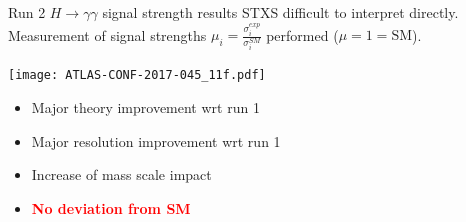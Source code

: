 \begin{frame}{Run 2 $H\rightarrow \gamma\gamma$ signal strength results}
  STXS difficult to interpret directly.\\
  Measurement of signal strengths $\mu_i = \frac{\sigma_i^{exp}}{\sigma_i^{SM}}$  performed ($\mu=1=\text{SM}$).\\

  \begin{minipage}{0.49\linewidth}
    \texttt{[image: ATLAS-CONF-2017-045\_11f.pdf]}
  \end{minipage}
  \hfill
  \begin{minipage}{0.49\linewidth}
    \centering

  \end{minipage}

  \begin{center}
  \begin{minipage}{0.62\linewidth}
    \begin{itemize}
    \item Major theory improvement wrt run 1
    \item Major resolution improvement wrt run 1
    \item Increase of mass scale impact
    \item   \textcolor{red}{\bf No deviation from SM}
      \end{itemize}
  \end{minipage}

  \end{center}
\end{frame}
